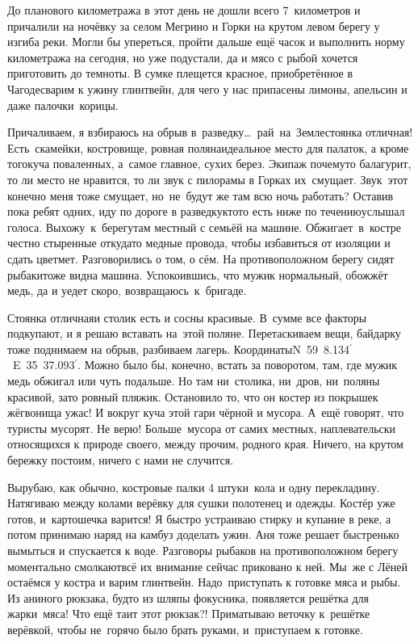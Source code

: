 До планового километража в этот день не дошли всего 7~километров и причалили на ночёвку за селом Мегрино и Горки на крутом левом берегу у изгиба реки. Могли бы упереться, пройти дальше ещё часок и выполнить норму километража на сегодня, но уже подустали, да и мясо с рыбой хочется приготовить до темноты. В сумке плещется красное, приобретённое в Чагоде\mdash сварим к ужину глинтвейн, для чего у нас припасены лимоны, апельсин и даже палочки~корицы. 

Причаливаем, я взбираюсь на обрыв в~разведку\ldots~рай~на~Земле\mdash стоянка отличная! Есть~скамейки, костровище, ровная поляна\mdash идеальное место для палаток, а кроме того\mdash куча поваленных, а~самое главное, сухих берез. Экипаж почему\sdash то балагурит, то ли место не нравится, то ли звук с пилорамы в Горках их~смущает. Звук~этот конечно меня тоже смущает, но~не~будут же там всю ночь работать? Оставив пока ребят одних, иду по дороге в разведку\mdash кто\sdash то есть ниже по течению\mdash услышал голоса. Выхожу~к~берегу\mdash там местный с семьёй на машине. Обжигает~в~костре честно стыренные откуда\sdash то медные провода, чтобы избавиться от изоляции и сдать цветмет. Разговорились о том, о сём. На противоположном берегу сидят рыбаки\mdash тоже видна машина. Успокоившись, что мужик нормальный, обожжёт медь, да и уедет скоро, возвращаюсь~к~бригаде. 

Стоянка отличная\mdash и столик есть и сосны красивые. В~сумме все факторы подкупают, и я решаю вставать на~этой поляне. Перетаскиваем вещи, байдарку тоже поднимаем на обрыв, разбиваем лагерь. Координаты\mdash N~59\degree~8.134$^\prime$ ~E~35\degree~37.093$^\prime$. Можно было бы, конечно, встать за поворотом, там, где мужик медь обжигал или чуть подальше. Но там ни~столика, ни~дров, ни~поляны красивой, зато ровный пляжик. Остановило то, что он костер из покрышек жёг\mdash вонища ужас! И вокруг куча этой гари чёрной и мусора. А~ещё говорят, что туристы мусорят. Не верю! Больше~мусора от самих местных, наплевательски относящихся к природе своего, между прочим, родного края. Ничего, на крутом бережку постоим, ничего с нами не случится.

Вырубаю, как обычно, костровые палки 4 штуки~кола и одну перекладину. Натягиваю между колами верёвку для сушки полотенец и одежды. Костёр уже готов, и~картошечка варится! Я быстро устраиваю стирку и купание в реке, а потом принимаю наряд на камбуз доделать ужин. Аня тоже решает быстренько вымыться и спускается к воде. Разговоры рыбаков на противоположном берегу моментально смолкают\mdash всё их внимание сейчас приковано к ней. Мы~же с Лёней остаёмся у костра и варим глинтвейн. Надо~приступать к готовке мяса и рыбы. Из аниного рюкзака, будто из шляпы фокусника, появляется решётка для жарки~мяса! Что ещё таит этот рюкзак?! Приматываю веточку к~решётке верёвкой, чтобы не~горячо было брать руками, и~приступаем к готовке. 


